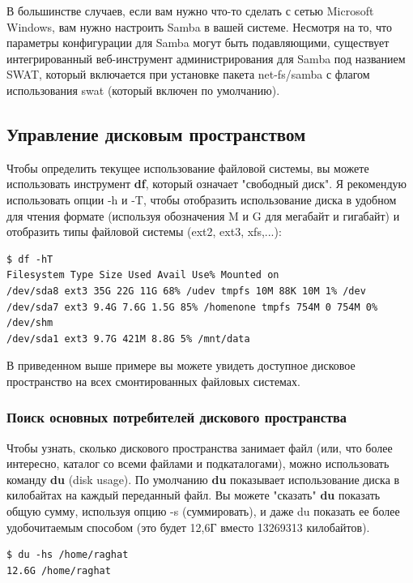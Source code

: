\documentclass[10pt]{book}
\begin{document}
В большинстве случаев, если вам нужно что-то сделать с сетью Microsoft Windows, вам нужно настроить Samba в вашей системе. Несмотря на то, что параметры конфигурации для Samba могут быть подавляющими, существует интегрированный веб-инструмент администрирования для Samba под названием SWAT, который включается при установке пакета net-fs/samba с флагом использования swat (который включен по умолчанию).

\subsection{Управление дисковым пространством}

Чтобы определить текущее использование файловой системы, вы можете использовать инструмент \textbf{df}, который означает "свободный диск". Я рекомендую использовать опции -h и -T, чтобы отобразить использование диска в удобном для чтения формате (используя обозначения M и G для мегабайт и гигабайт) и отобразить типы файловой системы (ext2, ext3, xfs,...):

\begin{tcolorbox} 
\begin{lstlisting}
$ df -hT
Filesystem Type Size Used Avail Use% Mounted on
/dev/sda8 ext3 35G 22G 11G 68% /udev tmpfs 10M 88K 10M 1% /dev
/dev/sda7 ext3 9.4G 7.6G 1.5G 85% /homenone tmpfs 754M 0 754M 0% /dev/shm
/dev/sda1 ext3 9.7G 421M 8.8G 5% /mnt/data
\end{lstlisting}
\end{tcolorbox}

В приведенном выше примере вы можете увидеть доступное дисковое пространство на всех смонтированных файловых системах.

\subsubsection{Поиск основных потребителей дискового пространства}

Чтобы узнать, сколько дискового пространства занимает файл (или, что более интересно, каталог со всеми файлами и подкаталогами), можно использовать команду \textbf{du} (disk usage). По умолчанию \textbf{du} показывает использование диска в килобайтах на каждый переданный файл. Вы можете "сказать" \textbf{du} показать общую сумму, используя опцию -s (суммировать), и даже du показать ее более удобочитаемым способом (это будет 12,6Г вместо 13269313 килобайтов).

\begin{tcolorbox} 
\begin{lstlisting}
$ du -hs /home/raghat
12.6G /home/raghat
\end{lstlisting}
\end{tcolorbox}
\end{document}
